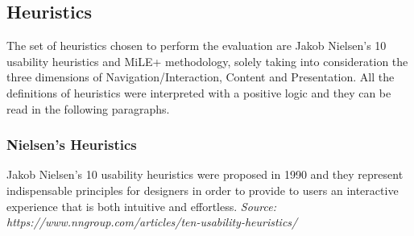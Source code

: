 
\subsection{Heuristics}
The set of heuristics chosen to perform the evaluation are Jakob Nielsen's 10 usability heuristics and MiLE+ methodology, solely taking into consideration the three dimensions of Navigation/Interaction, Content and Presentation. All the definitions of heuristics were interpreted with a positive logic and they can be read in the following paragraphs.

\subsubsection{Nielsen’s Heuristics}
Jakob Nielsen’s 10 usability heuristics were proposed in 1990 and they represent indispensable principles for designers in order to provide to users an interactive experience that is both intuitive and effortless.
\textit{Source: https://www.nngroup.com/articles/ten-usability-heuristics/}

